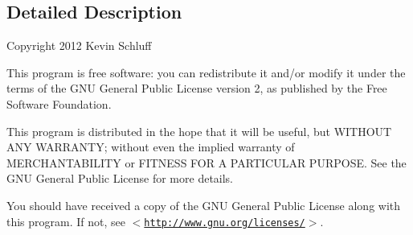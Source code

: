 \subsection{Detailed Description}
Copyright 2012 Kevin Schluff

This program is free software: you can redistribute it and/or modify it under the terms of the GNU General Public License version 2, as published by the Free Software Foundation.

This program is distributed in the hope that it will be useful, but WITHOUT ANY WARRANTY; without even the implied warranty of MERCHANTABILITY or FITNESS FOR A PARTICULAR PURPOSE. See the GNU General Public License for more details.

You should have received a copy of the GNU General Public License along with this program. If not, see $<$\href{http://www.gnu.org/licenses/}{\tt http://www.gnu.org/licenses/}$>$. 

